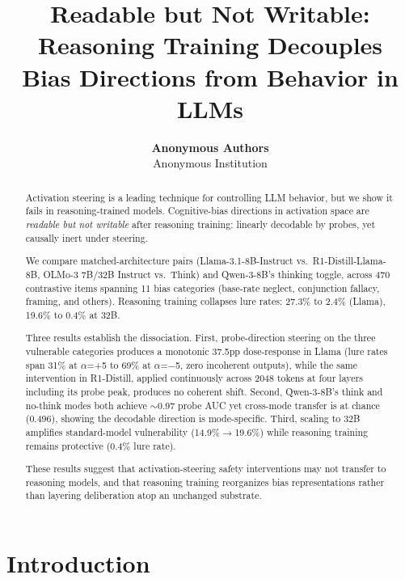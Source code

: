 \documentclass{article}
\title{Readable but Not Writable: Reasoning Training Decouples\\
  Bias Directions from Behavior in LLMs}
\author{%
  \textbf{Anonymous Authors}\\
  Anonymous Institution\\
}
\date{}
\begin{document}
\maketitle


\begin{abstract}
Activation steering is a leading technique for controlling LLM behavior,
but we show it fails in reasoning-trained models.  Cognitive-bias
directions in activation space are \emph{readable but not writable}
after reasoning training: linearly decodable by probes, yet causally
inert under steering.

We compare matched-architecture pairs (Llama-3.1-8B-Instruct vs.\
R1-Distill-Llama-8B, OLMo-3 7B/32B Instruct vs.\ Think) and
Qwen-3-8B's thinking toggle, across 470 contrastive items spanning 11
bias categories (base-rate neglect, conjunction fallacy, framing, and
others).  Reasoning training collapses lure rates: 27.3\% to 2.4\%
(Llama), 19.6\% to 0.4\% at 32B.

Three results establish the dissociation.  First, probe-direction
steering on the three vulnerable categories produces a monotonic 37.5pp
dose-response in Llama (lure rates span 31\% at $\alpha$=+5 to 69\%
at $\alpha$=$-$5, zero incoherent outputs), while the same intervention
in R1-Distill, applied continuously across 2048 tokens at four layers
including its probe peak, produces no coherent shift.  Second,
Qwen-3-8B's think and no-think modes both achieve ${\sim}$0.97 probe
AUC yet cross-mode transfer is at chance (0.496), showing the decodable
direction is mode-specific.  Third, scaling to 32B amplifies
standard-model vulnerability (14.9\%$\to$19.6\%) while reasoning
training remains protective (0.4\% lure rate).

These results suggest that activation-steering safety interventions may
not transfer to reasoning models, and that reasoning training
reorganizes bias representations rather than layering deliberation atop
an unchanged substrate.
\end{abstract}


\section{Introduction}
\label{sec:intro}
\end{document}
